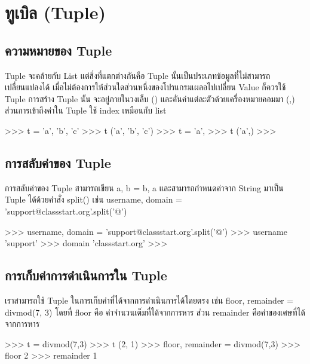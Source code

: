 \chapter{ทูเบิล (Tuple)}
\section{ความหมายของ Tuple}

Tuple จะคล้ายกับ List แต่สิ่งที่แตกต่างกันคือ Tuple นั้นเป็นประเภทข้อมูลที่ไม่สามารถเปลี่ยนแปลงได้ เมื่อไม่ต้องการให้ส่วนใดส่วนหนึ่งของโปรแกรมเผลอไปเปลี่ยน Value ก็ควรใช้ Tuple การสร้าง Tuple นั้น จะอยู่ภายในวงเล็บ () และคั่นค่าแต่ละตัวด้วยเครื่องหมายคอมมา (,) ส่วนการเข้าถึงค่าใน Tuple ใช้ index เหมือนกับ list

\begin{pycode}
>>> t = 'a', 'b', 'c'
>>> t
('a', 'b', 'c')
>>> t = 'a',
>>> t
('a',)
>>>
\end{pycode}



\section{การสลับค่าของ Tuple}

การสลับค่าของ Tuple สามารถเขียน a, b = b, a และสามารถกำหนดค่าจาก String มาเป็น Tuple ได้ด้วยคำสั่ง split() เช่น username, domain = 'support@classstart.org'.split('@')

\begin{pycode}
>>> username, domain = 'support@classstart.org'.split('@')
>>> username
'support'
>>> domain
'classstart.org'
>>>
\end{pycode}


\section{การเก็บค่าการดำเนินการใน Tuple}

เราสามารถใช้ Tuple ในการเก็บค่าที่ได้จากการดำเนินการได้โดยตรง เช่น  floor, remainder = divmod(7, 3) โดยที่ floor คือ ค่าจำนวนเต็มที่ได้จากการหาร ส่วน remainder คือค่าของเศษที่ได้จากการหาร

\begin{pycode}
>>> t = divmod(7,3)
>>> t
(2, 1)
>>> floor, remainder = divmod(7,3)
>>> floor
2
>>> remainder
1
\end{pycode}

